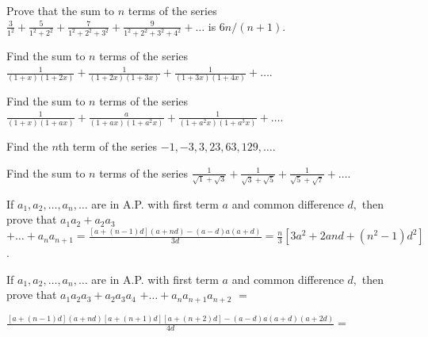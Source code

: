 \item Prove that the sum to $n$ terms of the series $\frac{3}{1^2} + \frac{5}{1^2 + 2^2} + \frac{7}{1^2 + 2^2 + 3^2} +
  \frac{9}{1^2 + 2^2 + 3^2 + 4^2} + \ldots$ is $6n/(n + 1)$.
\item Find the sum to $n$ terms of the series $\frac{1}{(1 + x)(1 + 2x)} + \frac{1}{(1 + 2x)(1 + 3x)} + \frac{1}{(1 +
  3x)(1 + 4x)} + \ldots$.
\item Find the sum to $n$ terms of the series $\frac{1}{(1 + x)(1 + ax)} + \frac{a}{(1 + ax)(1 + a^2x)} + \frac{1}{(1 +
  a^2x)(1 + a^3x)} + \ldots$.
\item Find the $n$th term of the series $-1, -3, 3, 23, 63, 129, \ldots$.
\item Find the sum to $n$ terms of the series $\frac{1}{\sqrt{1} + \sqrt{3}} + \frac{1}{\sqrt{3} + \sqrt{5}} +
  \frac{1}{\sqrt{5} + \sqrt{7}} + \ldots$.
\item If $a_1, a_2, \ldots, a_n, \ldots$ are in A.P. with first term $a$ and common difference $d,$ then prove that
  $a_1a_2 + a_2a_3$ $+ \ldots + a_na_{n +1} = \frac{[a + (n - 1)d](a + nd) - (a - d)a(a + d)}{3d} = \frac{n}{3}[3a^2 + 2and + (n^2
  - 1)d^2]$.
\item If $a_1, a_2, \ldots, a_n, \ldots$ are in A.P. with first term $a$ and common difference $d,$ then prove that
  $a_1a_2a_3 + a_2a_3a_4$ $+ \ldots + a_na_{n +1}a_{n + 2}$ $=$

  $\frac{[a + (n - 1)d](a + nd)[a + (n + 1)d][a + (n + 2)d] - (a -
  d)a(a + d)(a + 2d)}{4d}=$

